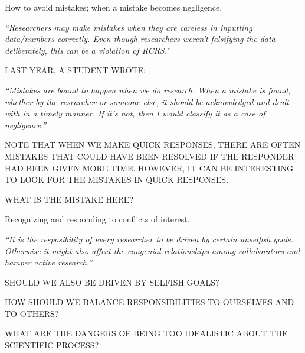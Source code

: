 \documentclass[portrait,11pt]{seminar}
\begin{document}
\es


\bs
  How to avoid mistakes; when a mistake becomes negligence.


{\it ``Researchers may make mistakes when they are careless in inputting data/numbers correctly. Even though researchers weren't falsifying the data deliberately, this can be a violation of RCRS.''}

\es

\bs

LAST YEAR, A STUDENT WROTE:
 
{\it ``Mistakes are bound to happen when we do research. When a mistake is found, whether by the researcher or someone else, it should be acknowledged and dealt with in a timely manner. If it's not, then I would classify it as a case of negligence.''}


\medskip

NOTE THAT WHEN WE MAKE QUICK RESPONSES, THERE ARE OFTEN MISTAKES THAT COULD HAVE BEEN RESOLVED IF THE RESPONDER HAD BEEN GIVEN MORE TIME. HOWEVER, IT CAN BE INTERESTING TO LOOK FOR THE MISTAKES IN QUICK RESPONSES.

 
\medskip
 
WHAT IS THE MISTAKE HERE? 


\es

\bs
  Recognizing and responding to conflicts of interest.


{
\it ``It is the resposibility of every researcher to be driven by certain unselfish goals.
Otherwise it might also affect the congenial relationships among collaborators and
hamper active research.''
}

\medskip 

SHOULD WE ALSO BE DRIVEN BY SELFISH GOALS? 

\medskip

HOW SHOULD WE BALANCE RESPONSIBILITIES TO OURSELVES AND TO OTHERS?

\medskip

WHAT ARE THE DANGERS OF BEING TOO IDEALISTIC ABOUT THE SCIENTIFIC PROCESS?
\end{document}
